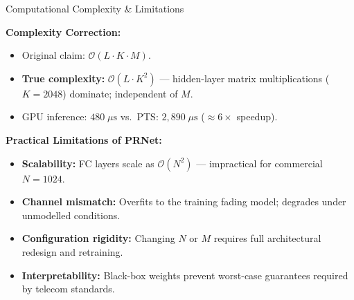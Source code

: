 \documentclass[20pt]{beamer}
\begin{document}
\begin{frame}{Computational Complexity \& Limitations}

    \fontsize{13}{17}\selectfont
    \textbf{Complexity Correction:}
    \begin{itemize}
        \item Original claim: $\mathcal{O}(L \cdot K \cdot M)$.
        \item \textbf{True complexity:} $\mathcal{O}(L \cdot K^2)$ --- hidden-layer
              matrix multiplications ($K = 2048$) dominate; independent of $M$.
        \item GPU inference: $480\;\mu\text{s}$ vs.\ PTS: $2{,}890\;\mu\text{s}$
              ($\approx 6\times$ speedup).
    \end{itemize}

    \vspace{0.3cm}
    \textbf{Practical Limitations of PRNet:}
    \begin{itemize}
        \item \textbf{Scalability:} FC layers scale as $\mathcal{O}(N^2)$ ---
              impractical for commercial $N = 1024$.
        \item \textbf{Channel mismatch:} Overfits to the training fading model;
              degrades under unmodelled conditions.
        \item \textbf{Configuration rigidity:} Changing $N$ or $M$ requires full
              architectural redesign and retraining.
        \item \textbf{Interpretability:} Black-box weights prevent worst-case
              guarantees required by telecom standards.
    \end{itemize}

\end{frame}
\end{document}

